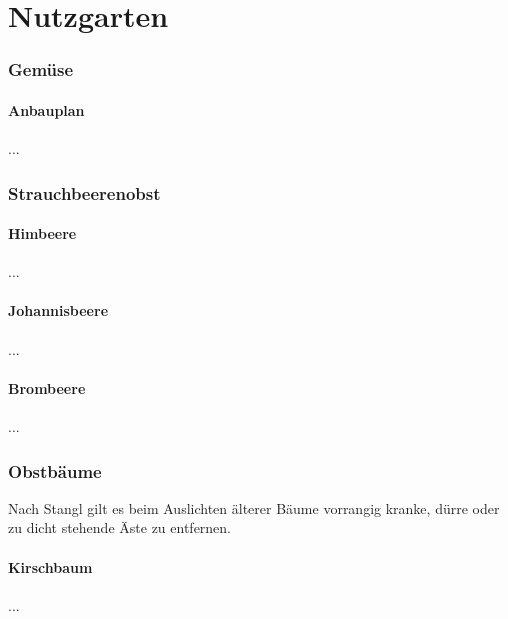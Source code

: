 \part{Nutzgarten}

\pagebreak

\section{Gemüse}

\subsection{Anbauplan}
...

\section{Strauchbeerenobst}

\subsection{Himbeere}
...

\subsection{Johannisbeere}
...

\subsection{Brombeere}
...

\section{Obstbäume}
\label{Bäume}

Nach Stangl \cite[S.~256]{Stangl1995} gilt es beim Auslichten älterer Bäume vorrangig kranke, dürre oder zu dicht stehende Äste zu entfernen.

\subsection{Kirschbaum}
...



\pagebreak